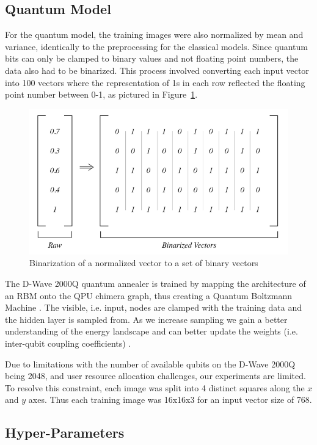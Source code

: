 \documentclass[%
 reprint,
 amsmath,amssymb,
 aps,
]{revtex4-2}
\begin{document}
\subsection{Quantum Model}
\label{binarize}
For the quantum model, the training images were also normalized by mean and variance, identically to the preprocessing for the classical models. Since quantum bits can only be clamped to binary values and not floating point numbers, the data also had to be binarized. This process involved converting each input vector into 100 vectors where the representation of 1s in each row reflected the floating point number between 0-1, as pictured in Figure~\ref{fig:binarize}.

\begin{figure}[h]
    \includegraphics[width=0.9\columnwidth]{binarize.png}
    \caption{\label{fig:binarize} Binarization of a normalized vector to a set of binary vectors \cite{Jain2020}}
\end{figure}


The D-Wave 2000Q quantum annealer is trained by mapping the architecture of an RBM onto the QPU chimera graph, thus creating a Quantum Boltzmann Machine \cite{dwavedocs}. The visible, i.e. input, nodes are clamped with the training data and the hidden layer is sampled from. As we increase sampling we gain a better understanding of the energy landscape and can better update the weights (i.e. inter-qubit coupling coefficients) \cite{Jain2020}.


Due to limitations with the number of available qubits on the D-Wave 2000Q being 2048, and user resource allocation challenges, our experiments are limited. To resolve this constraint, each image was split into 4 distinct squares along the $x$ and $y$ axes. Thus each training image was 16x16x3 for an input vector size of 768.

\subsection{Hyper-Parameters}
\end{document}
